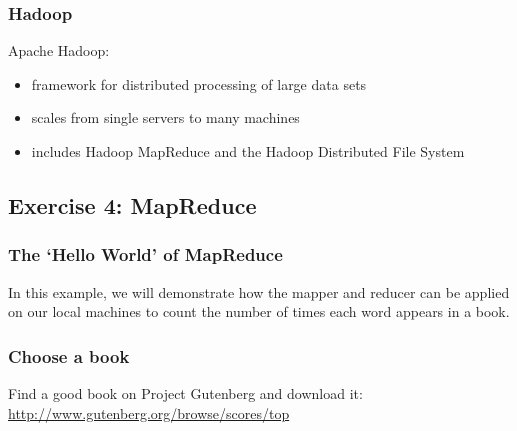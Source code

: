 \subsubsection{Hadoop}\label{hadoop}

Apache Hadoop:

\begin{itemize}
\itemsep1pt\parskip0pt
\item
  framework for distributed processing of large data sets
\item
  scales from single servers to many machines
\item
  includes Hadoop MapReduce and the Hadoop Distributed File System
\end{itemize}

\subsection{Exercise 4: MapReduce}\label{exercise-4-mapreduce}

\subsubsection{The `Hello World' of
MapReduce}\label{the-hello-world-of-mapreduce}

In this example, we will demonstrate how the mapper and reducer can be
applied on our local machines to count the number of times each word
appears in a book.

\subsubsection{Choose a book}\label{choose-a-book}

Find a good book on Project Gutenberg and download it:
\url{http://www.gutenberg.org/browse/scores/top}

\begin{Shaded}
\begin{Highlighting}[]
\NormalTok{$ } 
\end{Highlighting}
\end{Shaded}

\begin{Shaded}
\begin{Highlighting}[]
\NormalTok{$ } 


 
 
 
\end{Highlighting}
\end{Shaded}

